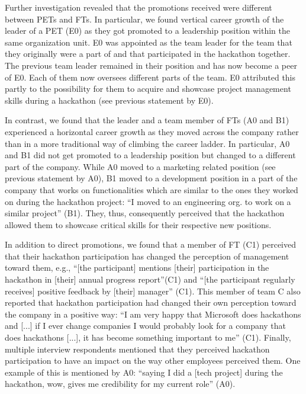 \documentclass{hcij}
\begin{document}
Further investigation revealed that the promotions received were different between PETs and FTs. In particular, we found vertical career growth of the leader of a PET (E0) as they got promoted to a leadership position within the same organization unit. E0 was appointed as the team leader for the team that they originally were a part of and that participated in the hackathon together. The previous team leader remained in their position and has now become a peer of E0. Each of them now oversees different parts of the team. E0 attributed this partly to the possibility for them to acquire and showcase project management skills during a hackathon (see previous statement by E0).

In contrast, we found that the leader and a team member of FTs (A0 and B1) experienced a horizontal career growth as they moved across the company rather than in a more traditional way of climbing the career ladder. In particular, A0 and B1 did not get promoted to a leadership position but changed to a different part of the company. While A0 moved to a marketing related position (see previous statement by A0), B1 moved to a development position in a part of the company that works on functionalities which are similar to the ones they worked on during the hackathon project: “I moved to an engineering org. to work on a similar project” (B1). They, thus, consequently perceived that the hackathon allowed them to showcase critical skills for their respective new positions.

In addition to direct promotions, we found that a member of FT (C1) perceived that their hackathon participation has changed the perception of management toward them, e.g., “[the participant] mentions [their] participation in the hackathon in [their] annual progress report”(C1) and “[the participant regularly receives] positive feedback by [their] manager” (C1). This member of team C also reported that hackathon participation had changed their own perception toward the company in a positive way: “I am very happy that Microsoft does hackathons and [...] if I ever change companies I would probably look for a company that does hackathons [...], it has become something important to me” (C1). Finally, multiple interview respondents mentioned that they perceived hackathon participation to have an impact on the way other employees perceived them. One example of this is mentioned by A0: “saying I did a [tech project] during the hackathon, wow, gives me credibility for my current role” (A0).
\end{document}
